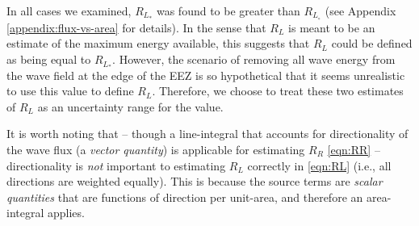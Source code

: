 In all cases we examined, $R_{L_*}$ was found to be greater than $R_{L_\circ}$ (see Appendix \ref{appendix:flux-vs-area} for details). In the sense that $R_L$ is meant to be an estimate of the maximum energy available, this suggests that $R_L$ could be defined as being equal to $R_{L_*}$. However, the scenario of removing all wave energy from the wave field at the edge of the EEZ is so hypothetical that it seems unrealistic to use this value to define $R_L$. Therefore, we choose to treat these two estimates of $R_L$ as an uncertainty range for the value.

It is worth noting that -- though a line-integral that accounts for directionality of the wave flux (a {\em vector quantity}) is applicable for estimating $R_R$ \eqref{eqn:RR} -- directionality is {\em not } important to estimating $R_L$ correctly in \eqref{eqn:RL} (i.e., all directions are weighted equally). This is because the source terms are {\em scalar quantities} that are functions of direction per unit-area, and therefore an area-integral applies.


